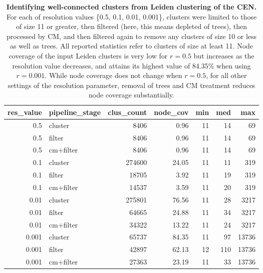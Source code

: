 \documentclass[11pt]{article}   	%
\begin{document}
\begin{table}[ht]
\centering
\begin{tabular}{rlrrrrr}
  \hline
res\_value & pipeline\_stage & clus\_count & node\_cov & min & med & max \\
  \hline
0.5 & cluster &  8406 & 0.96 &    11 & 14 &    69 \\
  0.5 & filter &  8406 & 0.96 &    11 & 14 &    69 \\
  0.5 & cm+filter &  8406 & 0.96 &    11 & 14 &    69 \\
  \hline
  0.1 & cluster & 274600 & 24.05 &    11 & 11 &   319 \\
  0.1 & filter & 18705 & 3.92 &    11 & 19 &   319 \\
  0.1 & cm+filter & 14537 & 3.59 &    11 & 20 &   319 \\
  \hline
  0.01 & cluster & 275801 & 76.56 &    11 & 28 &  3217 \\
  0.01 & filter & 64665 & 24.88 &    11 & 34 &  3217 \\
  0.01 & cm+filter & 34322 & 13.22 &    11 & 24 &  3217 \\
  \hline
  0.001 & cluster & 65737 & 84.35 &    11 & 97 & 13736 \\
  0.001 & filter & 42897 & 62.13 &    12 & 110 & 13736 \\
  0.001 & cm+filter & 27363 & 23.19 &    11 & 33 & 13736 \\
   \hline
\end{tabular}
\caption{\textbf{Identifying well-connected clusters from Leiden clustering of the CEN.} For each of resolution values \{0.5, 0.1, 0.01, 0.001\}, clusters were limited to those of size 11 or greater, then filtered (here, this means depleted of trees), then processed by CM, and then filtered again to remove any clusters of size 10 or less as well as trees. All reported statistics  refer to clusters of size at least 11.
Node coverage of the input Leiden clusters is very low for $r=0.5$ but increases as the resolution value decreases, and attains its highest value of 84.35\% when using $r=0.001$.
While node coverage does not change when $r=0.5$, for all other settings of the resolution parameter, removal of trees and CM treatment reduces node coverage substantially.}
\label{tab:CEN-Leiden-11-CM}
\end{table}
\end{document}
